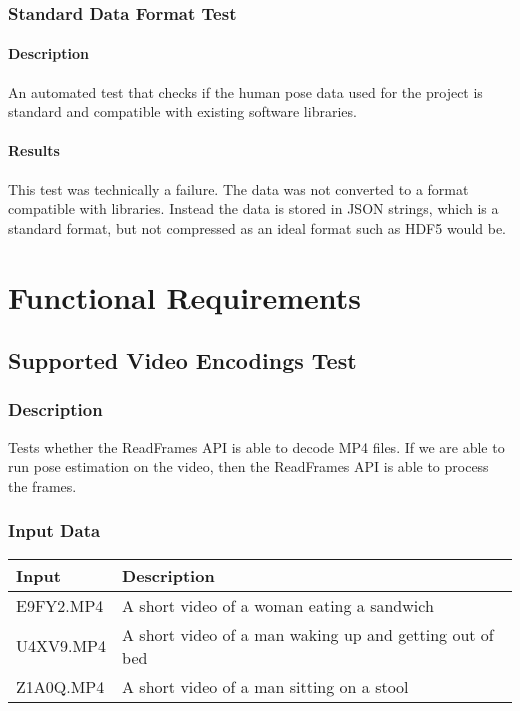 \documentclass{scrreprt}
\begin{document}
\subsection{Standard Data Format Test}

\subsubsection{Description}

An automated test that checks if the human pose data used for the project is
standard and compatible with existing software libraries.

\subsubsection{Results}

This test was technically a failure. The data was not converted to a format
compatible with libraries. Instead the data is stored in JSON strings, which is
a standard format, but not compressed as an ideal format such as HDF5 would be.

\chapter{Functional Requirements}

\section{Supported Video Encodings Test}

\subsection{Description}

Tests whether the ReadFrames API is able to decode MP4 files. If we are able to
run pose estimation on the video, then the ReadFrames API is able to process the
frames.

\subsection{Input Data}

\begin{table}[H]
        \centering
        \begin{tabular}{p{3cm}p{6cm}}
                \hline\hline
                Input & Description\\
                \hline\hline
                E9FY2.MP4  &  A short video of a woman eating a sandwich\\
                \hline
                U4XV9.MP4  &  A short video of a man waking up and getting out of bed\\
                \hline
                Z1A0Q.MP4 & A short video of a man sitting on a stool\\
                \hline
        \end{tabular}
\end{table}
\end{document}
